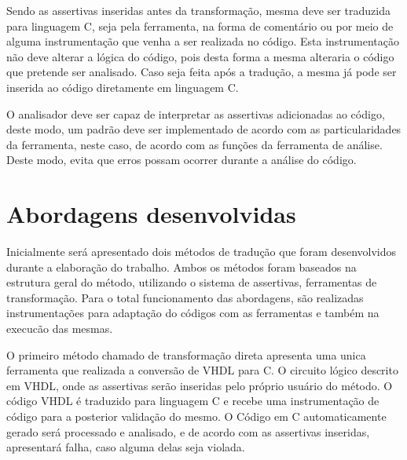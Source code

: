 \par
Sendo as assertivas inseridas antes da transformação, mesma deve ser traduzida para linguagem C, seja pela ferramenta, na forma de comentário ou por meio de alguma instrumentação que venha a ser realizada no código. Esta instrumentação não deve alterar a lógica do código, pois desta forma a mesma alteraria o código que pretende ser analisado. Caso seja feita após a tradução, a mesma já pode ser inserida ao código diretamente em linguagem C.

\par
O analisador deve ser capaz de interpretar as assertivas adicionadas ao código, deste modo, um padrão deve ser implementado de acordo com as particularidades da ferramenta, neste caso, de acordo com as funções da ferramenta de análise. Deste modo, evita que erros possam ocorrer durante a análise do código.
\section{Abordagens desenvolvidas}


\par
Inicialmente será apresentado dois métodos de tradução que foram desenvolvidos durante a elaboração do trabalho. Ambos os métodos foram baseados na estrutura geral do método, utilizando o sistema de assertivas, ferramentas de transformação. Para o total funcionamento das abordagens, são realizadas instrumentações para adaptação do códigos com as ferramentas e também na execucão das mesmas. 

\par
O primeiro método chamado de transformação direta apresenta uma unica ferramenta que realizada a conversão de VHDL para C. O circuito lógico descrito em VHDL, onde as assertivas serão inseridas pelo próprio usuário do método. O código VHDL é traduzido para linguagem C e recebe uma instrumentação de código para a posterior validação do mesmo. O Código em C automaticamente gerado será processado e analisado, e de acordo com as assertivas inseridas, apresentará falha, caso alguma delas seja violada. 


